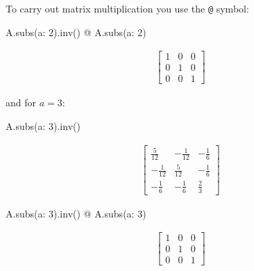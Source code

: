 To carry out matrix multiplication you use the \texttt{@} symbol:




\begin{pyin}
A.subs({a: 2}).inv() @ A.subs({a: 2})
\end{pyin}




\begin{equation*}
\begin{split}\displaystyle \left[\begin{matrix}1 & 0 & 0\\0 & 1 & 0\\0 & 0 & 1\end{matrix}\right]\end{split}
\end{equation*}




and for \(a = 3\):




\begin{pyin}
A.subs({a: 3}).inv()
\end{pyin}




\begin{equation*}
\begin{split}\displaystyle \left[\begin{matrix}\frac{5}{12} & - \frac{1}{12} & - \frac{1}{6}\\- \frac{1}{12} & \frac{5}{12} & - \frac{1}{6}\\- \frac{1}{6} & - \frac{1}{6} & \frac{2}{3}\end{matrix}\right]\end{split}
\end{equation*}






\begin{pyin}
A.subs({a: 3}).inv() @ A.subs({a: 3})
\end{pyin}




\begin{equation*}
\begin{split}\displaystyle \left[\begin{matrix}1 & 0 & 0\\0 & 1 & 0\\0 & 0 & 1\end{matrix}\right]\end{split}
\end{equation*}






